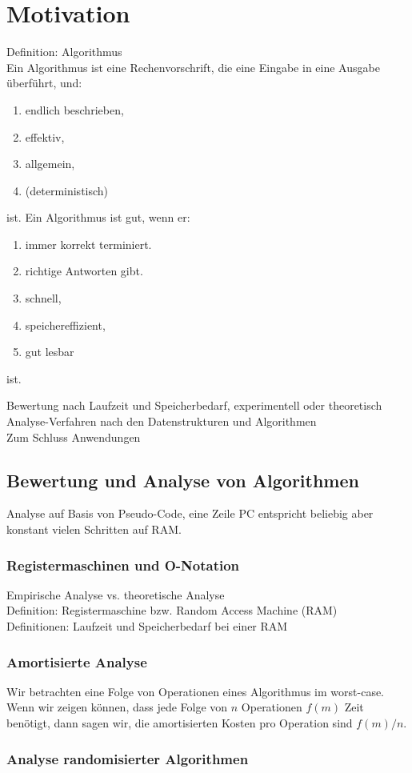 %
%
%
%
\section{Motivation}

Definition: Algorithmus\\
Ein Algorithmus ist eine Rechenvorschrift, die eine Eingabe in eine Ausgabe überführt, und:
\begin{enumerate}
	\item endlich beschrieben,
	\item effektiv,
	\item allgemein,
	\item (deterministisch)
\end{enumerate}
ist.
Ein Algorithmus ist gut, wenn er:
\begin{enumerate}
	\item immer korrekt terminiert.
	\item richtige Antworten gibt.
	\item schnell,
	\item speichereffizient,
	\item gut lesbar
\end{enumerate}
ist.

Bewertung nach Laufzeit und Speicherbedarf, experimentell oder theoretisch\\
Analyse-Verfahren nach den Datenstrukturen und Algorithmen\\
Zum Schluss Anwendungen

\subsection{Bewertung und Analyse von Algorithmen}

Analyse auf Basis von Pseudo-Code, eine Zeile PC entspricht beliebig aber konstant vielen Schritten auf RAM.
%
%
\subsubsection{Registermaschinen und O-Notation}
Empirische Analyse vs. theoretische Analyse\\
Definition: Registermaschine bzw. Random Access Machine (RAM)\\
Definitionen: Laufzeit und Speicherbedarf bei einer RAM
%
%
\subsubsection{Amortisierte Analyse}
Wir betrachten eine Folge von Operationen eines Algorithmus im worst-case.
Wenn wir zeigen können, dass jede Folge von $n$ Operationen $f(m)$ Zeit benötigt,
dann sagen wir, die amortisierten Kosten pro Operation sind $f(m)/n$.
%
%
\subsubsection{Analyse randomisierter Algorithmen}
